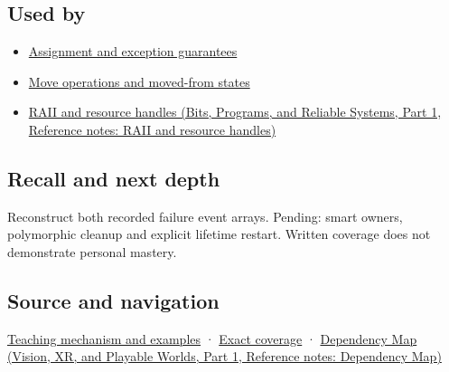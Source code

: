 \subsection{Used by}\label{appendix-9bfe377cef7a-used-by}

\hypertarget{appendix-9bfe377cef7a-used-by}{}

\begin{itemize}
\tightlist
\item
  \hyperref[appendix-bea6beb5350f]{Assignment and exception guarantees}
\item
  \hyperref[appendix-5636651017c2]{Move operations and moved-from states}
\item
  \href{../01-Bits-Programs-and-Reliable-Systems-P01/main.pdf\#appendix-69739d3ab49b}{RAII and resource handles (Bits, Programs, and Reliable Systems, Part 1, Reference notes: RAII and resource handles)}
\end{itemize}

\subsection{Recall and next depth}\label{appendix-9bfe377cef7a-recall-and-next-depth}

\hypertarget{appendix-9bfe377cef7a-recall-and-next-depth}{}

Reconstruct both recorded failure event arrays. Pending: smart owners, polymorphic cleanup and explicit lifetime restart. Written coverage does not demonstrate personal mastery.

\subsection{Source and navigation}\label{appendix-9bfe377cef7a-source-and-navigation}

\hypertarget{appendix-9bfe377cef7a-source-and-navigation}{}

\hyperref[01-foundations-i-ch003-destruction-closes-the-ownership-interval]{Teaching mechanism and examples} · \hyperref[appendix-fd090d982a15-m009---parts-127-147]{Exact coverage} · \href{../07-Vision-XR-and-Playable-Worlds-P01/main.pdf\#appendix-4ad47bdd269a}{Dependency Map (Vision, XR, and Playable Worlds, Part 1, Reference notes: Dependency Map)}
